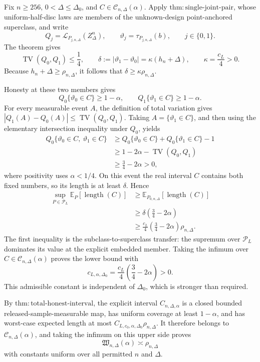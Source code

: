 Fix \(n\geq256\), \(0<\Delta\leq\Delta_0\), and \(C\in\mathcal C_{n,\Delta}(\alpha)\).  Apply \(\mathrm{thm:single\text{-}joint\text{-}pair}\), whose uniform-half-disc laws are members of the unknown-design point-anchored superclass, and write
\[
 Q_j=\mathcal L_{P_{j,n,\Delta}}(Z_\Delta^n),
 \qquad
 \vartheta_j=\tau_{P_{j,n,\Delta}}(b),
 \qquad j\in\{0,1\}.
\]
The theorem gives
\[
 \operatorname{TV}(Q_0,Q_1)\leq\frac14,
 \qquad
 \delta:=|\vartheta_1-\vartheta_0|
 =\kappa(h_n+\Delta),
 \qquad
 \kappa=\frac{c_L}{4}>0.
\]
Because \(h_n+\Delta\geq\rho_{n,\Delta}\), it follows that \(\delta\geq\kappa\rho_{n,\Delta}\).

Honesty at these two members gives
\[
 Q_0\{\vartheta_0\in C\}\geq1-\alpha,
 \qquad
 Q_1\{\vartheta_1\in C\}\geq1-\alpha.
\]
For every measurable event \(A\), the definition of total variation gives \(|Q_1(A)-Q_0(A)|\leq\operatorname{TV}(Q_0,Q_1)\).  Taking \(A=\{\vartheta_1\in C\}\), and then using the elementary intersection inequality under \(Q_0\), yields
\[
 \begin{aligned}
 Q_0\{\vartheta_0\in C,\ \vartheta_1\in C\}
 &\geq Q_0\{\vartheta_0\in C\}+Q_0\{\vartheta_1\in C\}-1\\
 &\geq1-2\alpha-\operatorname{TV}(Q_0,Q_1)\\
 &\geq\frac34-2\alpha>0,
 \end{aligned}
\]
where positivity uses \(\alpha<1/4\).  On this event the real interval \(C\) contains both fixed numbers, so its length is at least \(\delta\).  Hence
\[
 \begin{aligned}
 \sup_{P\in\mathcal P_L}\mathbb E_P[\operatorname{length}(C)]
 &\geq\mathbb E_{P_{0,n,\Delta}}[\operatorname{length}(C)]\\
 &\geq\delta\left(\frac34-2\alpha\right)\\
 &\geq\frac{c_L}{4}\left(\frac34-2\alpha\right)\rho_{n,\Delta}.
 \end{aligned}
\]
The first inequality is the subclass-to-superclass transfer: the supremum over \(\mathcal P_L\) dominates its value at the explicit embedded member.  Taking the infimum over \(C\in\mathcal C_{n,\Delta}(\alpha)\) proves the lower bound with
\[
 c_{L,\alpha,\Delta_0}
 =\frac{c_L}{4}\left(\frac34-2\alpha\right)>0.
\]
This admissible constant is independent of \(\Delta_0\), which is stronger than required.

By \(\mathrm{thm:total\text{-}honest\text{-}interval}\), the explicit interval \(C_{n,\Delta,\alpha}\) is a closed bounded released-sample-measurable map, has uniform coverage at least \(1-\alpha\), and has worst-case expected length at most \(C_{L,c_0,\alpha,\Delta_0}\rho_{n,\Delta}\).  It therefore belongs to \(\mathcal C_{n,\Delta}(\alpha)\), and taking the infimum on this upper side proves
\[
 \mathfrak W_{n,\Delta}(\alpha)\asymp\rho_{n,\Delta}
\]
with constants uniform over all permitted \(n\) and \(\Delta\).